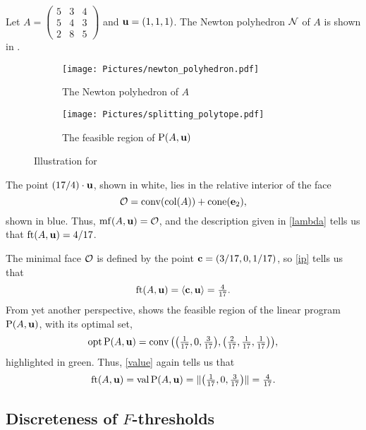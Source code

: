 \documentclass[11pt]{amsart}
\begin{document}
\begin{example}\label{ex: ft}
   Let $A=\left(\begin{smallmatrix}5&3&4\\ 5&4&3\\ 2&8&5\end{smallmatrix}\right)$ and $\mathbf{u} = (1,1,1)$.
   The Newton polyhedron $\mathcal{N}$ of $A$ is shown in .
   \begin{figure}
   \centering
   \begin{subfigure}{.48\textwidth}
      \centering
      \texttt{[image: Pictures/newton\_polyhedron.pdf]}\\[1.4mm]
      \caption{The Newton polyhedron of $A$}
      \label{fig: newton polyhedron}
   \end{subfigure}
   \begin{subfigure}{.48\textwidth}
      \centering
      \texttt{[image: Pictures/splitting\_polytope.pdf]} 
      \caption{The feasible region of $\mathrm{P}(A,\mathbf{u})$}
      \label{fig: splitting polytope}
   \end{subfigure}
      \caption{Illustration for }
   \label{fig: newton polyhedron and splitting polytope}
   \end{figure}
   The point $(17/4)\cdot \mathbf{u}$, shown in white, lies in the relative interior of the face
   \[\mathcal{O} = \operatorname{conv}(\operatorname{col}(A)) + \operatorname{cone}(\mathbf{e}_2),\]
   shown in blue.
   Thus, $\operatorname{mf}(A,\mathbf{u}) = \mathcal{O}$, and the description given in \eqref{lambda} tells us that $\operatorname{ft}(A, \mathbf{u}) = 4/17$.

   The minimal face $\mathcal{O}$ is defined by the point $\mathbf{c} = (3/17, 0, 1/17)$, so \eqref{ip} tells us that
   \[\operatorname{ft}(A, \mathbf{u}) = \langle \mathbf{c}, \mathbf{u} \rangle = \tfrac4{17}.\]
   From yet another perspective,  shows the feasible region of the linear program $\mathrm{P}(A,\mathbf{u})$, with its optimal set,
   \[\operatorname{opt} \mathrm{P}(A,\mathbf{u}) = \operatorname{conv}\big(\big(\tfrac1{17}, 0, \tfrac3{17}\big),\big(\tfrac2{17}, \tfrac1{17}, \tfrac1{17}\big)\big),\]
   highlighted in green.
   Thus, \eqref{value} again tells us that
   \[\operatorname{ft}(A, \mathbf{u}) = \operatorname{val} \mathrm{P}(A,\mathbf{u}) = \| \big(\tfrac1{17}, 0, \tfrac3{17}\big) \| = \tfrac4{17}.\]
\end{example}

\subsection{Discreteness of $F$-thresholds}
\end{document}

